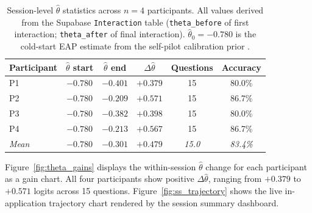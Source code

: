 \begin{table}[H]
\centering
\caption{Session-level $\hat{\theta}$ statistics across $n = 4$ participants.
All values derived from the Supabase \texttt{Interaction} table
(\texttt{theta\_before} of first interaction; \texttt{theta\_after} of final
interaction). $\hat{\theta}_{0} = -0.780$ is the cold-start EAP estimate from
the self-pilot calibration prior \parencite{question_bank_meta}.}
\label{tab:theta_trajectories}
\renewcommand{\arraystretch}{1.25}
\begin{tabular}{lccccc}
\toprule
\textbf{Participant} & \textbf{$\hat{\theta}$ start} & \textbf{$\hat{\theta}$ end}
  & \textbf{$\Delta\hat{\theta}$} & \textbf{Questions} & \textbf{Accuracy} \\
\midrule
P1 & $-0.780$ & $-0.401$ & $+0.379$ & 15 & 80.0\% \\
P2 & $-0.780$ & $-0.209$ & $+0.571$ & 15 & 86.7\% \\
P3 & $-0.780$ & $-0.382$ & $+0.398$ & 15 & 80.0\% \\
P4 & $-0.780$ & $-0.213$ & $+0.567$ & 15 & 86.7\% \\
\midrule
\textit{Mean} & \textit{$-0.780$} & \textit{$-0.301$} & \textit{$+0.479$}
  & \textit{15.0} & \textit{83.4\%} \\
\bottomrule
\end{tabular}
\end{table}

Figure~\ref{fig:theta_gains} displays the within-session $\hat{\theta}$ change
for each participant as a gain chart. All four participants show positive
$\Delta\hat{\theta}$, ranging from $+0.379$ to $+0.571$ logits across 15
questions. Figure~\ref{fig:ss_trajectory} shows the live in-application
trajectory chart rendered by the session summary dashboard.

